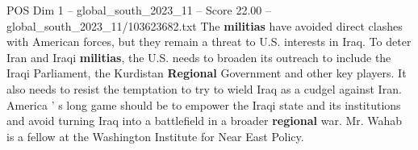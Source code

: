 \begin{textsample}{POS Dim 1 – global\_south\_2023\_11 – Score 22.00 – global\_south\_2023\_11/103623682.txt}
The \textbf{militias} have avoided direct clashes with American forces, but they remain a threat to U.S. interests in Iraq.
To deter Iran and Iraqi \textbf{militias}, the U.S. needs to broaden its outreach to include the Iraqi Parliament, the Kurdistan \textbf{Regional} Government and other key players.
It also needs to resist the temptation to try to wield Iraq as a cudgel against Iran.
America ' s long game should be to empower the Iraqi state and its institutions and avoid turning Iraq into a battlefield in a broader \textbf{regional} war.
Mr.
Wahab is a fellow at the Washington Institute for Near East Policy.

\end{textsample}
